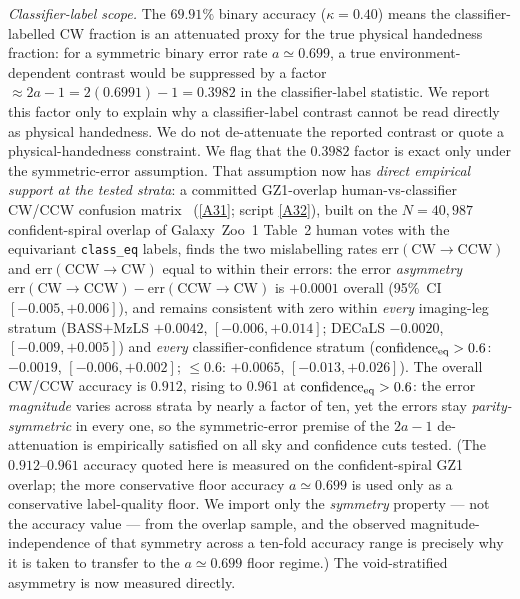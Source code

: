 \documentclass[twocolumn,linenumbers]{aastex702}
\newcommand{\repoBase}{https://github.com/Hubify-Projects/bigbounce/blob/main}
\begin{document}
\emph{Classifier-label scope.} The $69.91\%$ binary accuracy
($\kappa=0.40$) means the
classifier-labelled CW fraction is an attenuated proxy for the true
physical handedness fraction: for a symmetric binary error rate
$a\simeq0.699$, a true environment-dependent contrast would be
suppressed by a factor $\approx 2a-1 = 2(0.6991)-1 = 0.3982$ in the
classifier-label statistic. We report this factor only to explain why a
classifier-label contrast cannot be read directly as physical
handedness. We do not de-attenuate the reported contrast or quote a
physical-handedness constraint.
We flag that the $0.3982$ factor is exact only under the
symmetric-error assumption. That assumption now has \emph{direct empirical
support at the tested strata}: a committed GZ1-overlap human-vs-classifier
CW/CCW confusion matrix~\cite{golden_chirality_2026}
(\href{\repoBase/pipelines/p2\_chirality/outputs/gz1\_stratified\_confusion.json}{[A31]};
script \href{\repoBase/pipelines/p2\_chirality/scripts/gz1\_stratified\_confusion.py}{[A32]}),
built on the
$N=40{,}987$ confident-spiral overlap of Galaxy~Zoo~1 Table~2 human votes with
the equivariant \texttt{class\_eq} labels, finds the two mislabelling rates
$\mathrm{err}(\mathrm{CW}\!\to\!\mathrm{CCW})$ and
$\mathrm{err}(\mathrm{CCW}\!\to\!\mathrm{CW})$ equal to within their errors:
the error \emph{asymmetry}
$\mathrm{err}(\mathrm{CW}\!\to\!\mathrm{CCW})-\mathrm{err}(\mathrm{CCW}\!\to\!\mathrm{CW})$
is $+0.0001$ overall (95\%~CI $[-0.005,+0.006]$), and remains consistent with
zero within \emph{every} imaging-leg stratum (BASS$+$MzLS $+0.0042$,
$[-0.006,+0.014]$; DECaLS $-0.0020$, $[-0.009,+0.005]$) and \emph{every}
classifier-confidence stratum ($\mathrm{confidence}_{\rm eq}>0.6$: $-0.0019$,
$[-0.006,+0.002]$; $\le0.6$: $+0.0065$, $[-0.013,+0.026]$). The overall
CW/CCW accuracy is $0.912$, rising to $0.961$ at
$\mathrm{confidence}_{\rm eq}>0.6$: the error \emph{magnitude} varies across
strata by nearly a factor of ten, yet the errors stay
\emph{parity-symmetric} in every one, so the symmetric-error premise of the
$2a-1$ de-attenuation is empirically satisfied on all sky and confidence cuts
tested. (The $0.912$--$0.961$ accuracy quoted here is measured on the
confident-spiral GZ1 overlap; the more conservative floor accuracy
$a\!\simeq\!0.699$ is used only as a conservative label-quality floor.
We import only the
\emph{symmetry} property --- not the accuracy value --- from the overlap
sample, and the observed magnitude-independence of that symmetry across a
ten-fold accuracy range is precisely why it is taken to transfer to the
$a\!\simeq\!0.699$ floor regime.) The void-stratified asymmetry is now measured directly.
\end{document}
